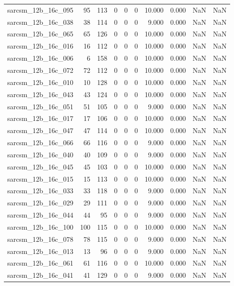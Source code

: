 \documentclass{article}
\begin{document}
\begin{longtable}{lrrrrrrrrr}
sarcsm\_12b\_16c\_095 & 95 & 113 & 0 & 0 & 0 & 10.000 & 0.000 & NaN & NaN \\
sarcsm\_12b\_16c\_038 & 38 & 114 & 0 & 0 & 0 & 9.000 & 0.000 & NaN & NaN \\
sarcsm\_12b\_16c\_065 & 65 & 126 & 0 & 0 & 0 & 10.000 & 0.000 & NaN & NaN \\
sarcsm\_12b\_16c\_016 & 16 & 112 & 0 & 0 & 0 & 10.000 & 0.000 & NaN & NaN \\
sarcsm\_12b\_16c\_006 & 6 & 158 & 0 & 0 & 0 & 10.000 & 0.000 & NaN & NaN \\
sarcsm\_12b\_16c\_072 & 72 & 112 & 0 & 0 & 0 & 10.000 & 0.000 & NaN & NaN \\
sarcsm\_12b\_16c\_010 & 10 & 128 & 0 & 0 & 0 & 10.000 & 0.000 & NaN & NaN \\
sarcsm\_12b\_16c\_043 & 43 & 124 & 0 & 0 & 0 & 10.000 & 0.000 & NaN & NaN \\
sarcsm\_12b\_16c\_051 & 51 & 105 & 0 & 0 & 0 & 9.000 & 0.000 & NaN & NaN \\
sarcsm\_12b\_16c\_017 & 17 & 106 & 0 & 0 & 0 & 10.000 & 0.000 & NaN & NaN \\
sarcsm\_12b\_16c\_047 & 47 & 114 & 0 & 0 & 0 & 10.000 & 0.000 & NaN & NaN \\
sarcsm\_12b\_16c\_066 & 66 & 116 & 0 & 0 & 0 & 9.000 & 0.000 & NaN & NaN \\
sarcsm\_12b\_16c\_040 & 40 & 109 & 0 & 0 & 0 & 9.000 & 0.000 & NaN & NaN \\
sarcsm\_12b\_16c\_045 & 45 & 103 & 0 & 0 & 0 & 10.000 & 0.000 & NaN & NaN \\
sarcsm\_12b\_16c\_015 & 15 & 113 & 0 & 0 & 0 & 10.000 & 0.000 & NaN & NaN \\
sarcsm\_12b\_16c\_033 & 33 & 118 & 0 & 0 & 0 & 9.000 & 0.000 & NaN & NaN \\
sarcsm\_12b\_16c\_029 & 29 & 111 & 0 & 0 & 0 & 9.000 & 0.000 & NaN & NaN \\
sarcsm\_12b\_16c\_044 & 44 & 95 & 0 & 0 & 0 & 9.000 & 0.000 & NaN & NaN \\
sarcsm\_12b\_16c\_100 & 100 & 115 & 0 & 0 & 0 & 10.000 & 0.000 & NaN & NaN \\
sarcsm\_12b\_16c\_078 & 78 & 115 & 0 & 0 & 0 & 9.000 & 0.000 & NaN & NaN \\
sarcsm\_12b\_16c\_013 & 13 & 96 & 0 & 0 & 0 & 9.000 & 0.000 & NaN & NaN \\
sarcsm\_12b\_16c\_061 & 61 & 116 & 0 & 0 & 0 & 10.000 & 0.000 & NaN & NaN \\
sarcsm\_12b\_16c\_041 & 41 & 129 & 0 & 0 & 0 & 9.000 & 0.000 & NaN & NaN \\

\end{longtable}
\end{document}
